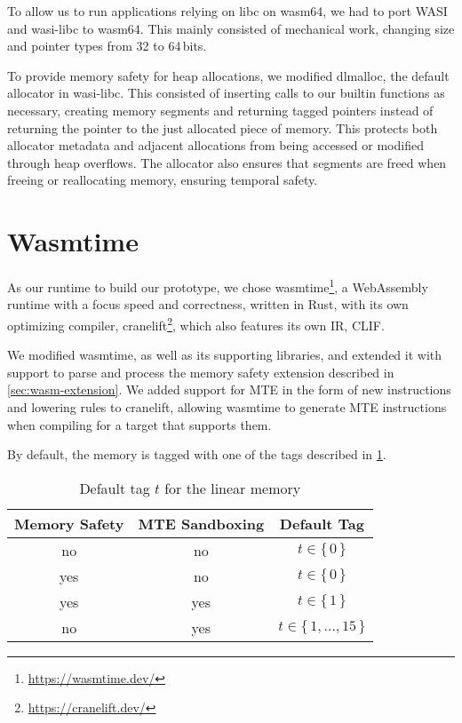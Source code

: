 To allow us to run applications relying on libc on wasm64, we had to port \ac{WASI} and wasi-libc to wasm64.
This mainly consisted of mechanical work, changing size and pointer types from 32 to 64\,bits.

To provide memory safety for heap allocations, we modified dlmalloc, the default allocator in wasi-libc.
This consisted of inserting calls to our builtin functions as necessary, creating memory segments and returning tagged pointers instead of returning the pointer to the just allocated piece of memory.
This protects both allocator metadata and adjacent allocations from being accessed or modified through heap overflows.
The allocator also ensures that segments are freed when freeing or reallocating memory, ensuring temporal safety.

\section{Wasmtime}
\label{sec:wasm-runtime}

As our runtime to build our prototype, we chose wasmtime\footnote{\url{https://wasmtime.dev/}}, a WebAssembly runtime with a focus speed and correctness, written in Rust, with its own optimizing compiler, cranelift\footnote{\url{https://cranelift.dev/}}, which also features its own \ac{IR}, \ac{CLIF}.

We modified wasmtime, as well as its supporting libraries, and extended it with support to parse and process the memory safety extension described in \cref{sec:wasm-extension}.
We added support for \ac{MTE} in the form of new instructions and lowering rules to cranelift, allowing wasmtime to generate \ac{MTE} instructions when compiling for a target that supports them.

By default, the memory is tagged with one of the tags described in \cref{tab:default-tag}.

\begin{table}
  \centering
  \begin{tabular}{c | c || c}
    \textbf{Memory Safety} & \textbf{MTE Sandboxing} & \textbf{Default Tag} \\
    \hline
    no & no & $t \in \{\,0\,\}$ \\
    yes & no & $t \in \{\,0\,\}$ \\
    yes & yes & $t \in \{\,1\,\}$ \\
    no & yes & $t \in \{\,1, \dots, 15\,\}$
  \end{tabular}
  \caption{Default tag $t$ for the linear memory}
  \label{tab:default-tag}
\end{table}

